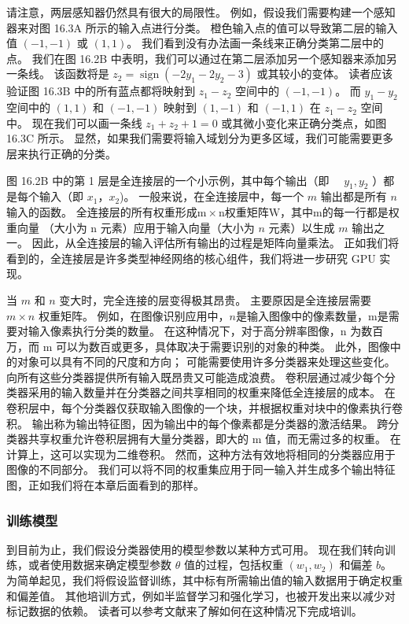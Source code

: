 请注意，两层感知器仍然具有很大的局限性。 例如，假设我们需要构建一个感知器来对图 16.3A 所示的输入点进行分类。 橙色输入点的值可以导致第二层的输入值 $(-1,-1)$ 或 $(1,1)$。 我们看到没有办法画一条线来正确分类第二层中的点。 我们在图 16.2B 中表明，我们可以通过在第二层添加另一个感知器来添加另一条线。 该函数将是 $z_{2}=\operatorname{sign}\left(-2 y_{1}-2 y_{2}-3\right)$ 或其较小的变体。 读者应该验证图 16.3B 中的所有蓝点都将映射到 $z_{1}-z_{2}$ 空间中的 $(-1,-1)$。 而 $y_{1}-y_{2}$ 空间中的 $(1,1)$ 和 $(-1,-1)$ 映射到 $(1,-1)$ 和 $(-1,1 )$ 在 $z_{1}-z_{2}$ 空间中。 现在我们可以画一条线 $z_{1}+z_{2}+1=0$ 或其微小变化来正确分类点，如图 16.3C 所示。 显然，如果我们需要将输入域划分为更多区域，我们可能需要更多层来执行正确的分类。

图 16.2B 中的第 1 层是全连接层的一个小示例，其中每个输出（即 $\quad y_{1}, y_{2}$ ）都是每个输入（即 $x_{ 1}，x_{2}$)。 一般来说，在全连接层中，每一个 $m$ 输出都是所有 $n$ 输入的函数。 全连接层的所有权重形成$\mathrm{m} \times \mathrm{n}$权重矩阵$\mathrm{W}$，其中$\mathrm{m}$的每一行都是权重向量 （大小为 $\mathrm{n}$ 元素）应用于输入向量（大小为 $n$ 元素）以生成 $m$ 输出之一。 因此，从全连接层的输入评估所有输出的过程是矩阵向量乘法。 正如我们将看到的，全连接层是许多类型神经网络的核心组件，我们将进一步研究 GPU 实现。

当 $m$ 和 $n$ 变大时，完全连接的层变得极其昂贵。 主要原因是全连接层需要 $m \times n$ 权重矩阵。 例如，在图像识别应用中，$n$是输入图像中的像素数量，$\mathrm{m}$是需要对输入像素执行分类的数量。 在这种情况下，对于高分辨率图像，$\mathrm{n}$ 为数百万，而 $\mathrm{m}$ 可以为数百或更多，具体取决于需要识别的对象的种类。 此外，图像中的对象可以具有不同的尺度和方向； 可能需要使用许多分类器来处理这些变化。 向所有这些分类器提供所有输入既昂贵又可能造成浪费。 卷积层通过减少每个分类器采用的输入数量并在分类器之间共享相同的权重来降低全连接层的成本。 在卷积层中，每个分类器仅获取输入图像的一个块，并根据权重对块中的像素执行卷积。 输出称为输出特征图，因为输出中的每个像素都是分类器的激活结果。 跨分类器共享权重允许卷积层拥有大量分类器，即大的 $\mathrm{m}$ 值，而无需过多的权重。 在计算上，这可以实现为二维卷积。 然而，这种方法有效地将相同的分类器应用于图像的不同部分。 我们可以将不同的权重集应用于同一输入并生成多个输出特征图，正如我们将在本章后面看到的那样。

\subsubsection{训练模型}
到目前为止，我们假设分类器使用的模型参数以某种方式可用。 现在我们转向训练，或者使用数据来确定模型参数 $\theta$ 值的过程，包括权重 $\left(w_{1}, w_{2}\right)$ 和偏差 $b $。 为简单起见，我们将假设监督训练，其中标有所需输出值的输入数据用于确定权重和偏差值。 其他培训方式，例如半监督学习和强化学习，也被开发出来以减少对标记数据的依赖。 读者可以参考文献来了解如何在这种情况下完成培训。

